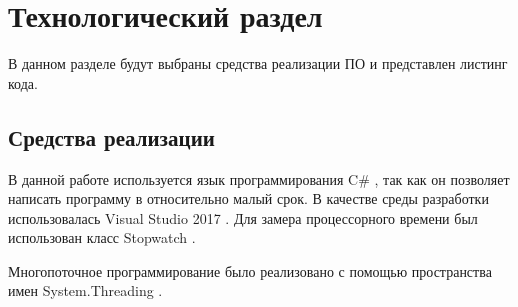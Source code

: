 \chapter{ Технологический раздел}
\label{cha:technological}

    В данном разделе будут выбраны средства реализации ПО и представлен листинг кода. 

    \section{Средства реализации}
        В данной работе используется язык программирования C\# \cite{Charp}, так как
        он позволяет написать программу в относительно малый срок.
        В качестве среды разработки использовалась Visual Studio 2017 \cite{visual-studio}. Для замера процессорного времени был использован класс Stopwatch \cite{stopwatch}.

	Многопоточное программирование было реализовано с помощью пространства имен System.Threading \cite{thread}.


